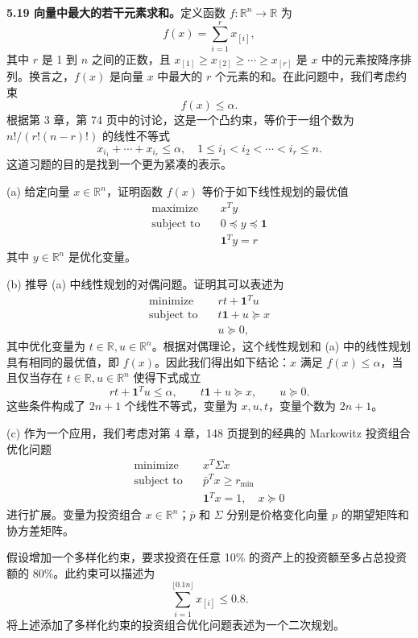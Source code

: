 \documentclass[UTF8,12pt,a4paper,fontset=fandol]{ctexart}
\begin{document}
\noindent\textbf{5.19 向量中最大的若干元素求和。}\quad 定义函数 $f:\mathbb{R}^n\to\mathbb{R}$ 为
\[
f(x)=\sum_{i=1}^r x_{[i]},
\]
其中 $r$ 是 1 到 $n$ 之间的正数，且 $x_{[1]}\geq x_{[2]}\geq\cdots\geq x_{[r]}$ 是 $x$ 中的元素按降序排列。换言之，$f(x)$ 是向量 $x$ 中最大的 $r$ 个元素的和。在此问题中，我们考虑约束
\[
f(x)\leq \alpha.
\]
根据第 3 章，第 74 页中的讨论，这是一个凸约束，等价于一组个数为 $n!/(r!(n-r)!)$ 的线性不等式
\[
x_{i_1}+\cdots+x_{i_r}\leq \alpha,\quad 1\leq i_1<i_2<\cdots<i_r\leq n.
\]
这道习题的目的是找到一个更为紧凑的表示。

(a) 给定向量 $x\in\mathbb{R}^n$，证明函数 $f(x)$ 等价于如下线性规划的最优值
\[
\begin{aligned}
\text{maximize}\quad & x^Ty\\
\text{subject to}\quad & 0\preceq y\preceq \mathbf{1}\\
& \mathbf{1}^Ty=r
\end{aligned}
\]
其中 $y\in\mathbb{R}^n$ 是优化变量。

(b) 推导 (a) 中线性规划的对偶问题。证明其可以表述为
\[
\begin{aligned}
\text{minimize}\quad & rt+\mathbf{1}^Tu\\
\text{subject to}\quad & t\mathbf{1}+u\succeq x\\
& u\succeq 0,
\end{aligned}
\]
其中优化变量为 $t\in\mathbb{R}, u\in\mathbb{R}^n$。根据对偶理论，这个线性规划和 (a) 中的线性规划具有相同的最优值，即 $f(x)$。因此我们得出如下结论：$x$ 满足 $f(x)\leq \alpha$，当且仅当存在 $t\in\mathbb{R}, u\in\mathbb{R}^n$ 使得下式成立
\[
rt+\mathbf{1}^Tu\leq \alpha,\qquad t\mathbf{1}+u\succeq x,\qquad u\succeq 0.
\]
这些条件构成了 $2n+1$ 个线性不等式，变量为 $x,u,t$，变量个数为 $2n+1$。

(c) 作为一个应用，我们考虑对第 4 章，148 页提到的经典的 Markowitz 投资组合优化问题
\[
\begin{aligned}
\text{minimize}\quad & x^T\Sigma x\\
\text{subject to}\quad & \bar{p}^Tx\geq r_{\min}\\
& \mathbf{1}^Tx=1,\quad x\succeq 0
\end{aligned}
\]
进行扩展。变量为投资组合 $x\in\mathbb{R}^n$；$\bar{p}$ 和 $\Sigma$ 分别是价格变化向量 $p$ 的期望矩阵和协方差矩阵。

假设增加一个多样化约束，要求投资在任意 10\% 的资产上的投资额至多占总投资额的 80\%。此约束可以描述为
\[
\sum_{i=1}^{\lfloor 0.1n\rfloor}x_{[i]}\leq 0.8.
\]
将上述添加了多样化约束的投资组合优化问题表述为一个二次规划。
\end{document}
